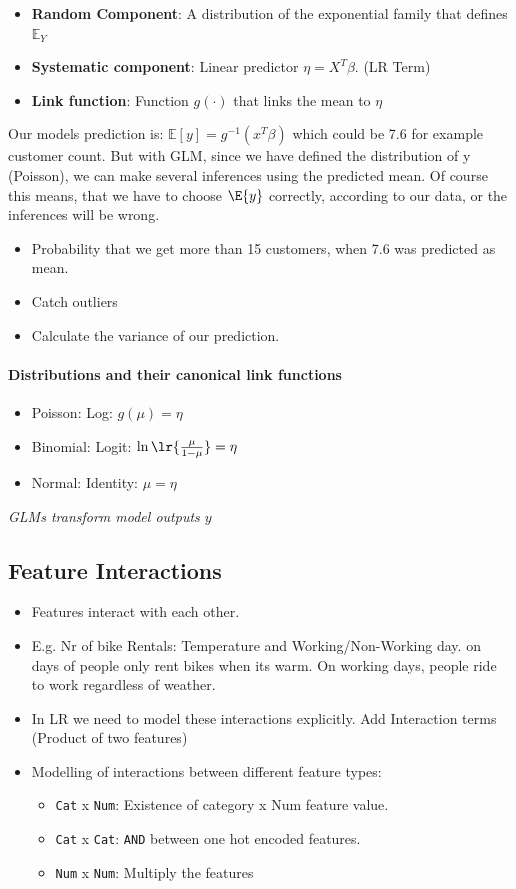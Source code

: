 \begin{itemize}
	\item \textbf{Random Component}: A distribution of the exponential family that defines $\mathbb{E}_Y$
	\item \textbf{Systematic component}: Linear predictor $\eta = X^T\beta$. (LR Term)
	\item \textbf{Link function}: Function $g(\cdot)$ that links the mean to $\eta$
\end{itemize}

Our models prediction is: $\mathbb{E}[y] = g^{-1}(x^T\beta)$ which could be 7.6 for example customer count.
But with GLM, since we have defined the distribution of y (Poisson), we can make several inferences using the predicted mean.
Of course this means, that we have to choose $\E{y}$ correctly, according to our data, or the inferences will be wrong.
\begin{itemize}
	\item Probability that we get more than 15 customers, when 7.6 was predicted as mean.
	\item Catch outliers
	\item Calculate the variance of our prediction.
\end{itemize}
\paragraph{Distributions and their canonical link functions}
\begin{itemize}
	\item Poisson: Log: $g(\mu) = \eta$
	\item Binomial: Logit: $\ln\lr{\frac{\mu}{1-\mu}}=\eta$
	\item Normal: Identity: $\mu=\eta$
\end{itemize}

\textit{GLMs transform model outputs $y$}

\subsection{Feature Interactions}
\begin{itemize}
	\item Features interact with each other.
	\item E.g. Nr of bike Rentals: Temperature and Working/Non-Working day. on days of people only rent bikes when its warm. On working days, people ride to work regardless of weather.
	\item In LR we need to model these interactions explicitly. Add Interaction terms (Product of two features)
	\item Modelling of interactions between different feature types:
	      \begin{itemize}
		      \item \texttt{Cat} x \texttt{Num}: Existence of category x Num feature value.
		      \item \texttt{Cat} x \texttt{Cat}: \texttt{AND} between one hot encoded features.
		      \item \texttt{Num} x \texttt{Num}: Multiply the features
	      \end{itemize}
\end{itemize}



